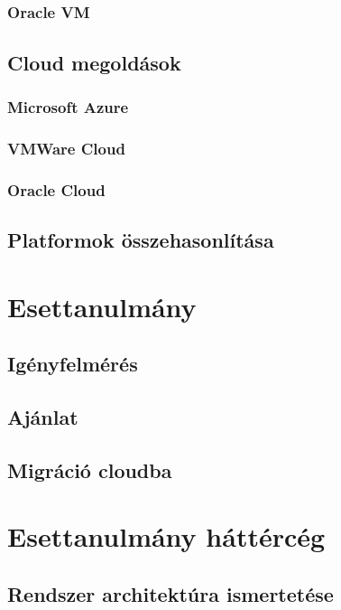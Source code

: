 \documentclass[12pt,oneside,justify]{book}
\begin{document}
\subsection{Oracle\textsuperscript{\textregistered} VM}
\noindent

\section{Cloud megoldások}
\subsection{Microsoft Azure}
\noindent

\subsection{VMWare Cloud}
\noindent

\subsection{Oracle Cloud}
\noindent

\section{Platformok összehasonlítása}
\noindent

\chapter{Esettanulmány}
\section{Igényfelmérés}
\noindent

\section{Ajánlat}
\noindent

\section{Migráció cloudba}
\noindent

\chapter{Esettanulmány háttércég}

\section{Rendszer architektúra ismertetése}
\end{document}

